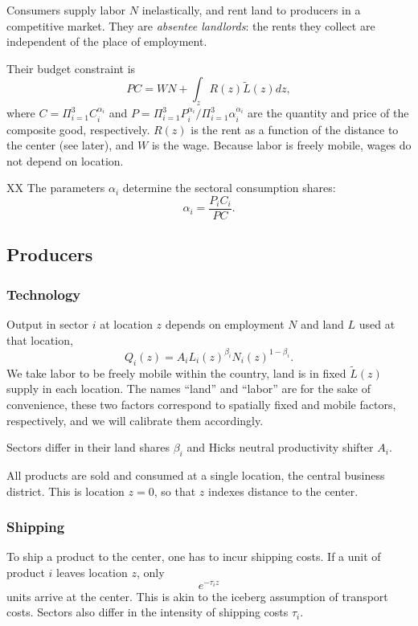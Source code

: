\documentclass[12pt]{article}
\begin{document}
Consumers supply labor $N$ inelastically, and rent land to producers in a competitive market. They are \emph{absentee landlords}: the rents they collect are independent of the place of employment.

Their budget constraint is
\begin{equation}
\label{eq:BudCons}
PC=WN+\int_z R(z)\tilde{L}(z)dz,
\end{equation}
where $C=\Pi_{i=1}^3C_i^{\alpha_i}$ and $P=\Pi_{i=1}^3P_i^{\alpha_i}/\Pi_{i=1}^3\alpha_i^{\alpha_i}$ are the quantity and price of the composite good, respectively. $R(z)$ is the rent as a function of the distance to the center (see later), and $W$ is the wage. Because labor is freely mobile, wages do not depend on location.

XX
The parameters $\alpha_i$ determine the sectoral consumption shares:
\begin{equation*}
\alpha_i=\frac{P_iC_i}{PC}.
\end{equation*}

\subsection{Producers}
\subsubsection{Technology}
Output in sector $i$ at location $z$ depends on employment $N$ and land $L$ used at that location,
\[
Q_i(z) = A_i L_i(z)^{\beta_i}N_i(z)^{1-\beta_i}.
\]
We take labor to be freely mobile within the country, land is in fixed $\tilde{L}(z)$ supply in each location. The names ``land'' and ``labor'' are for the sake of convenience, these two factors correspond to spatially fixed and mobile factors, respectively, and we will calibrate them accordingly.

Sectors differ in their land shares $\beta_i$ and Hicks neutral productivity shifter $A_i$.

All products are sold and consumed at a single location, the central business district. This is location $z=0$, so that $z$ indexes distance to the center.

\subsubsection{Shipping}
To ship a product to the center, one has to incur shipping costs. If a unit of product $i$ leaves location $z$, only
\[
e^{-\tau_i z}
\]
units arrive at the center. This is akin to the iceberg assumption of transport costs. Sectors also differ in the intensity of shipping costs $\tau_i$.
\end{document}
